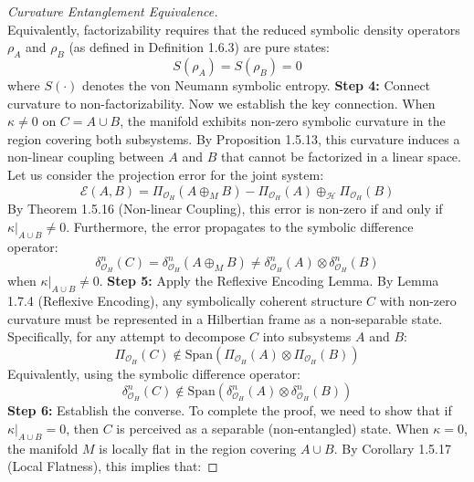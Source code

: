 \begin{proof}[Curvature Entanglement Equivalence]
\begin{equation}
\end{equation}
Equivalently, factorizability requires that the reduced symbolic density operators $\rho_A$ and $\rho_B$ (as defined in Definition 1.6.3) are pure states:
\begin{equation}
S(\rho_A) = S(\rho_B) = 0
\end{equation}
where $S(\cdot)$ denotes the von Neumann symbolic entropy.
\textbf{Step 4:} Connect curvature to non-factorizability.
Now we establish the key connection. When $\kappa \neq 0$ on $C = A \cup B$, the manifold exhibits non-zero symbolic curvature in the region covering both subsystems. By Proposition 1.5.13, this curvature induces a non-linear coupling between $A$ and $B$ that cannot be factorized in a linear space.
Let us consider the projection error for the joint system:
\begin{equation}
\mathcal{E}(A,B) = \Pi_{\mathcal{O}_H}(A \oplus_M B) - \Pi_{\mathcal{O}_H}(A) \oplus_{\mathcal{H}} \Pi_{\mathcal{O}_H}(B)
\end{equation}
By Theorem 1.5.16 (Non-linear Coupling), this error is non-zero if and only if $\kappa|_{A \cup B} \neq 0$. Furthermore, the error propagates to the symbolic difference operator:
\begin{equation}
\delta^n_{\mathcal{O}_H}(C) = \delta^n_{\mathcal{O}_H}(A \oplus_M B) \neq \delta^n_{\mathcal{O}_H}(A) \otimes \delta^n_{\mathcal{O}_H}(B)
\end{equation}
when $\kappa|_{A \cup B} \neq 0$.
\textbf{Step 5:} Apply the Reflexive Encoding Lemma.
By Lemma 1.7.4 (Reflexive Encoding), any symbolically coherent structure $C$ with non-zero curvature must be represented in a Hilbertian frame as a non-separable state. Specifically, for any attempt to decompose $C$ into subsystems $A$ and $B$:
\begin{equation}
\Pi_{\mathcal{O}_H}(C) \notin \text{Span}(\Pi_{\mathcal{O}_H}(A) \otimes \Pi_{\mathcal{O}_H}(B))
\end{equation}
Equivalently, using the symbolic difference operator:
\begin{equation}
\delta^n_{\mathcal{O}_H}(C) \notin \text{Span}(\delta^n_{\mathcal{O}_H}(A) \otimes \delta^n_{\mathcal{O}_H}(B))
\end{equation}
\textbf{Step 6:} Establish the converse.
To complete the proof, we need to show that if $\kappa|_{A \cup B} = 0$, then $C$ is perceived as a separable (non-entangled) state. When $\kappa = 0$, the manifold $M$ is locally flat in the region covering $A \cup B$. By Corollary 1.5.17 (Local Flatness), this implies that:

\end{proof}
